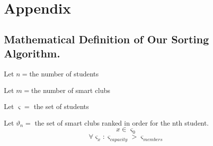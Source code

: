 \documentclass{article}
\begin{document}
\section{Appendix}
\subsection{Mathematical Definition of Our Sorting Algorithm. }
Let $n = $the number of students

Let $m = $the number of smart clubs

Let $\varsigma = $ the set of students

Let $\vartheta_n = $ the set of smart clubs ranked in order for the nth student.
\begin{equation}x \in \varsigma_0 \end{equation}
\begin{equation}
\forall \varsigma_x: \varsigma_{capacity} > \varsigma_{members}
\end{equation}
\end{document}
